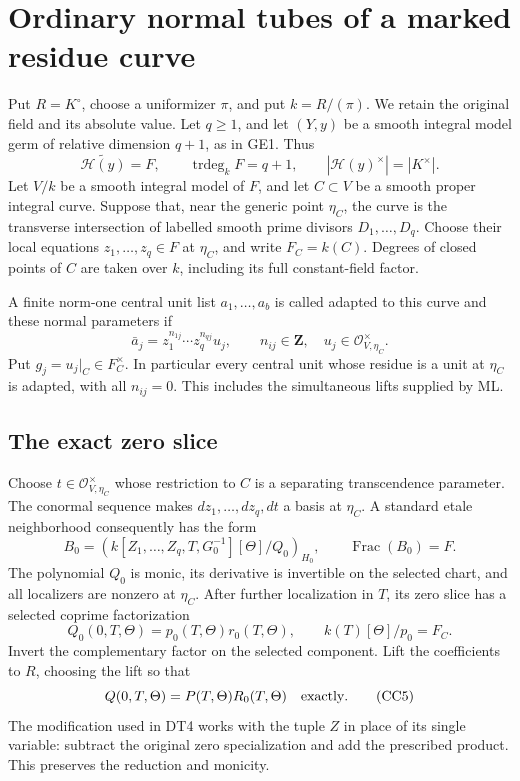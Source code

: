 \section{Ordinary normal tubes of a marked residue curve}
\label{sec:r13-cc-marked-curve-tubes}

Put \(R=K^\circ\), choose a uniformizer \(\pi\), and put
\(k=R/(\pi)\).  We retain the original field and its absolute value.
Let \(q\geq1\), and let \((Y,y)\) be a smooth integral model germ
of relative dimension \(q+1\), as in GE1.  Thus
\[
 \widetilde{\mathcal H(y)}=F,
 \qquad \operatorname{trdeg}_kF=q+1,
 \qquad |\mathcal H(y)^\times|=|K^\times|.
 \tag{CC1}
\]
Let \(V/k\) be a smooth integral model of \(F\), and let
\(C\subset V\) be a smooth proper integral curve.  Suppose that,
near the generic point \(\eta_C\), the curve is the transverse
intersection of labelled smooth prime divisors
\(D_1,\ldots,D_q\).  Choose their local equations
\(z_1,\ldots,z_q\in F\) at \(\eta_C\), and write
\(F_C=k(C)\).  Degrees of closed points of \(C\) are taken over
\(k\), including its full constant-field factor.

A finite norm-one central unit list \(a_1,\ldots,a_b\) is called
adapted to this curve and these normal parameters if
\[
 \bar a_j=z_1^{n_{1j}}\cdots z_q^{n_{qj}}u_j,
 \qquad n_{ij}\in\mathbf Z,
 \quad u_j\in\mathcal O_{V,\eta_C}^{\times}.
 \tag{CC2}
\]
Put \(g_j=u_j|_C\in F_C^\times\).  In particular every central
unit whose residue is a unit at \(\eta_C\) is adapted, with all
\(n_{ij}=0\).  This includes the simultaneous lifts supplied by ML.

\subsection{The exact zero slice}

Choose \(t\in\mathcal O_{V,\eta_C}^{\times}\) whose restriction
to \(C\) is a separating transcendence parameter.  The conormal
sequence makes
\(dz_1,\ldots,dz_q,dt\) a basis at \(\eta_C\).  A standard
etale neighborhood consequently has the form
\[
 B_0=\left(k[Z_1,\ldots,Z_q,T,G_0^{-1}][\Theta]/Q_0\right)_{H_0},
 \qquad \operatorname{Frac}(B_0)=F.
 \tag{CC3}
\]
The polynomial \(Q_0\) is monic, its derivative is invertible on
the selected chart, and all localizers are nonzero at \(\eta_C\).
After further localization in \(T\), its zero slice has a selected
coprime factorization
\[
 Q_0(0,T,\Theta)=p_0(T,\Theta)r_0(T,\Theta),
 \qquad k(T)[\Theta]/p_0=F_C.
 \tag{CC4}
\]
Invert the complementary factor on the selected component.  Lift
the coefficients to \(R\), choosing the lift so that
\[
                    Q(0,T,\Theta)=P(T,\Theta)R_0(T,\Theta)
                    \quad\hbox{exactly}.
 \tag{CC5}
\]
The modification used in DT4 works with the tuple \(Z\) in place
of its single variable: subtract the original zero specialization
and add the prescribed product.  This preserves the reduction and
monicity.

